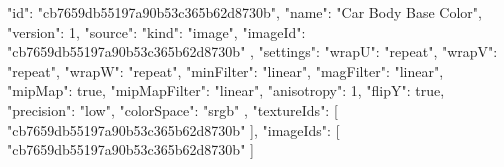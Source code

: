 {
  "id": "cb7659db55197a90b53c365b62d8730b",
  "name": "Car Body Base Color",
  "version": 1,
  "source": {
    "kind": "image",
    "imageId": "cb7659db55197a90b53c365b62d8730b"
  },
  "settings": {
    "wrapU": "repeat",
    "wrapV": "repeat",
    "wrapW": "repeat",
    "minFilter": "linear",
    "magFilter": "linear",
    "mipMap": true,
    "mipMapFilter": "linear",
    "anisotropy": 1,
    "flipY": true,
    "precision": "low",
    "colorSpace": "srgb"
  },
  "textureIds": [
    "cb7659db55197a90b53c365b62d8730b"
  ],
  "imageIds": [
    "cb7659db55197a90b53c365b62d8730b"
  ]
}

